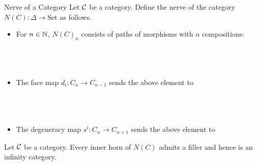 \documentclass[a4paper]{article}
\begin{document}
\begin{defn}{Nerve of a Category}{} Let $\mathcal{C}$ be a category. Define the nerve of the category $N(C):\Delta\to\text{Set}$ as follows. 
\begin{itemize}
\item For $n\in\mathbb{N}$, $N(C)_n$ consists of paths of morphisms with $n$ compositions: \\~\\
\\~\\
\item The face map $d_i:C_n\to C_{n-1}$ sends the above element to \\~\\
\\~\\
\item The degeneracy map $s^i:C_n\to C_{n+1}$ sends the above element to 
\end{itemize}
\end{defn}

\begin{thm}{}{} Let $\mathcal{C}$ be a category. Every inner horn of $N(C)$ admits a filler and hence is an infinity category. 
\end{thm}
\end{document}
